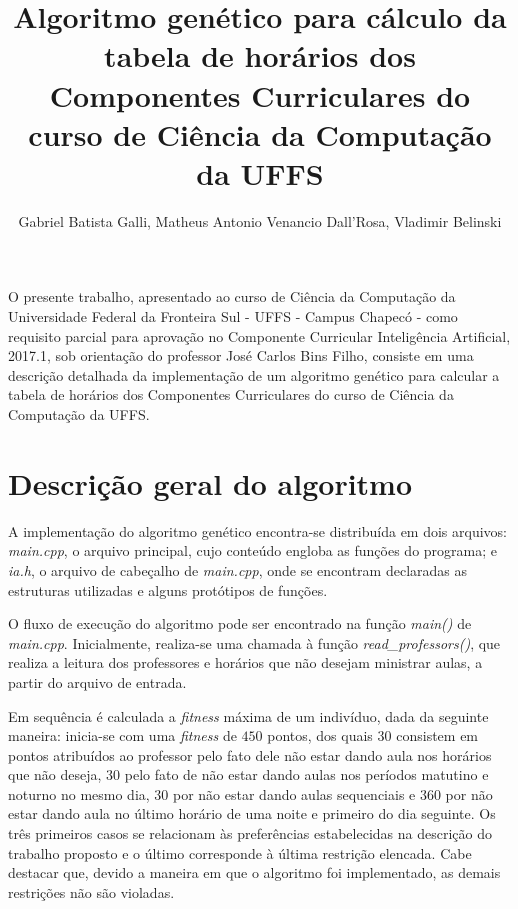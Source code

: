 \documentclass[12pt]{article}
\title{Algoritmo genético para cálculo da tabela de horários dos Componentes Curriculares do curso de Ciência da Computação da UFFS}
\author{Gabriel Batista Galli\inst{1}, Matheus Antonio Venancio Dall'Rosa\inst{1}, Vladimir Belinski\inst{1}}
\begin{document}
 

\maketitle
     
\begin{resumo} 
  O presente trabalho, apresentado ao curso de Ciência da Computação da Universidade Federal da Fronteira Sul - UFFS - Campus Chapecó - como requisito parcial para aprovação no Componente Curricular Inteligência Artificial, 2017.1, sob orientação do professor José Carlos Bins Filho, consiste em uma descrição detalhada da implementação de um algoritmo genético para calcular a tabela de horários dos Componentes Curriculares do curso de Ciência da Computação da UFFS.
\end{resumo}

\section{Descrição geral do algoritmo}

A implementação do algoritmo genético encontra-se distribuída em dois arquivos: \emph{main.cpp}, o arquivo principal, cujo conteúdo engloba as funções do programa; e \emph{ia.h}, o arquivo de cabeçalho de \emph{main.cpp}, onde se encontram declaradas as estruturas utilizadas e alguns protótipos de funções.

O fluxo de execução do algoritmo pode ser encontrado na função \emph{main()} de \emph{main.cpp}. Inicialmente, realiza-se uma chamada à função \emph{read\_professors()}, que realiza a leitura dos professores e horários que não desejam ministrar aulas, a partir do arquivo de entrada.

Em sequência é calculada a \textit{fitness} máxima de um indivíduo, dada da seguinte maneira: inicia-se com uma \textit{fitness} de $450$ pontos, dos quais $30$ consistem em pontos atribuídos ao professor pelo fato dele não estar dando aula nos horários que não deseja, $30$ pelo fato de não estar dando aulas nos períodos matutino e noturno no mesmo dia, $30$ por não estar dando aulas sequenciais e $360$ por não estar dando aula no último horário de uma noite e primeiro do dia seguinte. Os três primeiros casos se relacionam às preferências estabelecidas na descrição do trabalho proposto e o último corresponde à última restrição elencada. Cabe destacar que, devido a maneira em que o algoritmo foi implementado, as demais restrições não são violadas.
\end{document}
